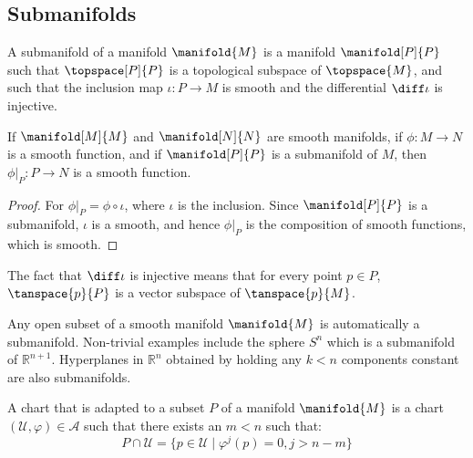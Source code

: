 \documentclass{article}                                                        %
\begin{document}
        \subsection{Submanifolds}
            \begin{definition}
                A submanifold of a manifold $\manifold{M}$ is a manifold
                $\manifold[P]{P}$ such that $\topspace[P]{P}$ is a topological
                subspace of $\topspace{M}$, and such that the inclusion map
                $\iota:P\rightarrow{M}$ is smooth and the differential
                $\diff\iota$ is injective.
            \end{definition}
            \begin{theorem}
                If $\manifold[M]{M}$ and $\manifold[N]{N}$ are smooth manifolds,
                if $\phi:M\rightarrow{N}$ is a smooth function, and if
                $\manifold[P]{P}$ is a submanifold of $M$, then
                $\phi|_{P}:P\rightarrow{N}$ is a smooth function.
            \end{theorem}
            \begin{proof}
                For $\phi|_{P}=\phi\circ\iota$, where $\iota$ is the inclusion.
                Since $\manifold[P]{P}$ is a submanifold, $\iota$ is a smooth,
                and hence $\phi|_{P}$ is the composition of smooth functions,
                which is smooth.
            \end{proof}
            The fact that $\diff\iota$ is injective means that for every point
            $p\in{P}$, $\tanspace{p}{P}$ is a vector subspace of
            $\tanspace{p}{M}$.
            \begin{example}
                Any open subset of a smooth manifold $\manifold{M}$ is
                automatically a submanifold. Non-trivial examples include the
                sphere $S^{n}$ which is a submanifold of $\mathbb{R}^{n+1}$.
                Hyperplanes in $\mathbb{R}^{n}$ obtained by holding any $k<n$
                components constant are also submanifolds.
            \end{example}
            \begin{definition}
                A chart that is adapted to a subset $P$ of a manifold
                $\manifold{M}$ is a chart $(\mathcal{U},\varphi)\in\mathcal{A}$
                such that there exists an $m<n$ such that:
                \begin{equation}
                    P\cap\mathcal{U}
                        =\{p\in\mathcal{U}\;|\;\varphi^{j}(p)=0,j>n-m\}
                \end{equation}
            \end{definition}
\end{document}
